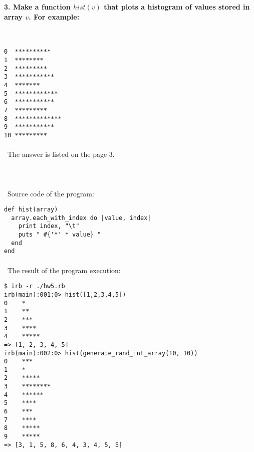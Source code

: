\documentclass{article}
\begin{document}
\paragraph{}\
\paragraph{}\

\paragraph{3. Make a function \(hist(v)\) that plots a histogram of values stored in array \(v\). For example:}\

\begin{verbatim} 
0  **********
1  ********
2  *********
3  ***********
4  *******
5  ************
6  ***********
7  *********
8  *************
9  ***********
10 *********
\end{verbatim}

\paragraph{}\
	The answer is listed on the page 3.
\paragraph{}\
	
\paragraph{}\
Source code of the program:

\begin{verbatim}
def hist(array)
  array.each_with_index do |value, index|
    print index, "\t"
    puts " #{'*' * value} "
  end
end
\end{verbatim}

\paragraph{}\
	The result of the program execution:
	
\begin{verbatim} 
$ irb -r ./hw5.rb
irb(main):001:0> hist([1,2,3,4,5])
0	 *
1	 **
2	 ***
3	 ****
4	 *****
=> [1, 2, 3, 4, 5]
irb(main):002:0> hist(generate_rand_int_array(10, 10))
0	 ***
1	 *
2	 *****
3	 ********
4	 ******
5	 ****
6	 ***
7	 ****
8	 *****
9	 *****
=> [3, 1, 5, 8, 6, 4, 3, 4, 5, 5]
\end{verbatim}
\end{document}

